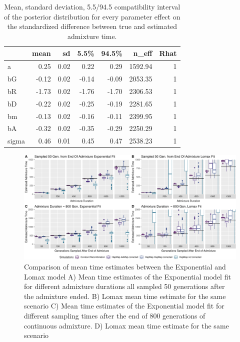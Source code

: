\documentclass[]{article}
\begin{document}
\begin{table}[h]
\caption{\label{tab:tableS1} Mean, standard deviation, 5.5/94.5 compatibility interval of the posterior distribution for every parameter effect on the standardized difference between true and estimated admixture time.}
\centering
\begin{tabular}{l|r|r|r|r|r|r}
\hline
  & mean & sd & 5.5\% & 94.5\% & n\_eff & Rhat\\
\hline
a & 0.25 & 0.02 & 0.22 & 0.29 & 1592.94 & 1\\
\hline
bG & -0.12 & 0.02 & -0.14 & -0.09 & 2053.35 & 1\\
\hline
bR & -1.73 & 0.02 & -1.76 & -1.70 & 2306.53 & 1\\
\hline
bD & -0.22 & 0.02 & -0.25 & -0.19 & 2281.65 & 1\\
\hline
bm & -0.13 & 0.02 & -0.16 & -0.11 & 2399.95 & 1\\
\hline
bA & -0.32 & 0.02 & -0.35 & -0.29 & 2250.29 & 1\\
\hline
sigma & 0.46 & 0.01 & 0.45 & 0.47 & 2538.23 & 1\\
\hline
\end{tabular}
\end{table}

\begin{figure}
\centering
\includegraphics{Admixture_Time_Inference_Paper_Draft_files/figure-latex/figS3-1.pdf}
\caption{\label{fig:figS2} Comparison of mean time estimates between the Exponential and Lomax model A) Mean time estimates of the Exponential model fit for different 
admixture durations all sampled 50 generations after the admixture ended. B)
Lomax mean time estimate for the same scenario C) Mean time estimates of the Exponential model fit for different sampling times after the end of 800
generations of continuous admixture. D) Lomax mean time estimate for the same scenario}
\end{figure}
\end{document}
